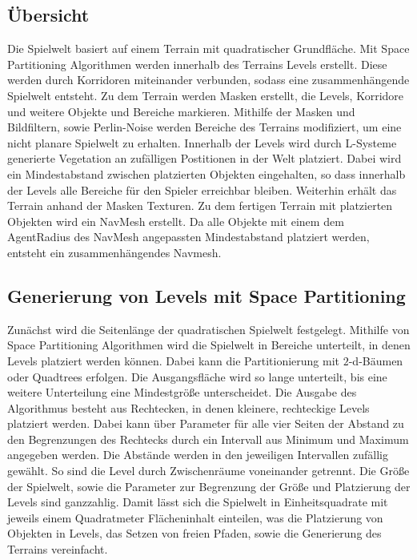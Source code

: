 \subsection{Übersicht}
Die Spielwelt basiert auf einem Terrain mit quadratischer Grundfläche. Mit Space Partitioning Algorithmen werden innerhalb des Terrains Levels erstellt. Diese werden durch Korridoren miteinander verbunden, sodass eine zusammenhängende Spielwelt entsteht. Zu dem Terrain werden Masken erstellt, die Levels, Korridore und weitere Objekte und Bereiche markieren. Mithilfe der Masken und Bildfiltern, sowie Perlin-Noise werden Bereiche des Terrains modifiziert, um eine nicht planare Spielwelt zu erhalten. Innerhalb der Levels wird durch L-Systeme generierte Vegetation an zufälligen Postitionen in der Welt platziert. Dabei wird ein Mindestabstand zwischen platzierten Objekten eingehalten, so dass innerhalb der Levels alle Bereiche für den Spieler erreichbar bleiben. Weiterhin erhält das Terrain anhand der Masken Texturen. Zu dem fertigen Terrain mit platzierten Objekten wird ein NavMesh erstellt. Da alle Objekte mit einem dem AgentRadius des NavMesh angepassten Mindestabstand platziert werden, entsteht ein zusammenhängendes Navmesh. 


\subsection{Generierung von Levels mit Space Partitioning}
Zunächst wird die Seitenlänge der quadratischen Spielwelt festgelegt. Mithilfe von Space Partitioning Algorithmen wird die Spielwelt in Bereiche unterteilt, in denen Levels platziert werden können. Dabei kann die Partitionierung mit $2$-d-Bäumen oder Quadtrees erfolgen. Die Ausgangsfläche wird so lange unterteilt, bis eine weitere Unterteilung eine Mindestgröße unterscheidet. Die Ausgabe des Algorithmus besteht aus Rechtecken, in denen kleinere, rechteckige Levels platziert werden. Dabei kann über Parameter für alle vier Seiten der Abstand zu den Begrenzungen des Rechtecks durch ein Intervall aus Minimum und Maximum angegeben werden. Die Abstände werden in den jeweiligen Intervallen zufällig gewählt. So sind die Level durch Zwischenräume voneinander getrennt. Die Größe der Spielwelt, sowie die Parameter zur Begrenzung der Größe und Platzierung der Levels sind ganzzahlig. Damit lässt sich die Spielwelt in Einheitsquadrate mit jeweils einem Quadratmeter Flächeninhalt einteilen, was die Platzierung von Objekten in Levels, das Setzen von freien Pfaden, sowie die Generierung des Terrains vereinfacht.


